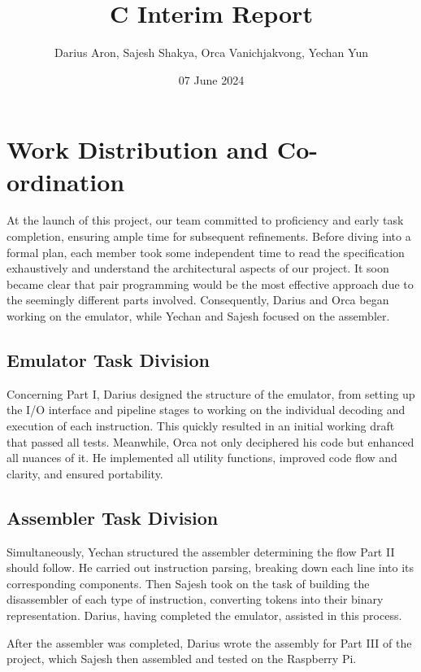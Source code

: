 \documentclass{article}
\title{C Interim Report}
\author{Darius Aron, Sajesh Shakya, Orca Vanichjakvong, Yechan Yun}
\date{07 June 2024}
\begin{document}
\maketitle

\section{Work Distribution and Co-ordination}

At the launch of this project, our team committed to proficiency and early task completion, ensuring ample time for subsequent refinements. Before diving into a formal plan, each member took some independent time to read the specification exhaustively and understand the architectural aspects of our project. It soon became clear that pair programming would be the most effective approach due to the seemingly different parts involved. Consequently, Darius and Orca began working on the emulator, while Yechan and Sajesh focused on the assembler.

\subsection{Emulator Task Division}

Concerning Part I, Darius designed the structure of the emulator, from setting up the I/O interface and pipeline stages to working on the individual decoding and execution of each instruction. This quickly resulted in an initial working draft that passed all tests. Meanwhile, Orca not only deciphered his code but enhanced all nuances of it. He implemented all utility functions, improved code flow and clarity, and ensured portability.

\subsection{Assembler Task Division}

Simultaneously, Yechan structured the assembler determining the flow Part II should follow. He carried out instruction parsing, breaking down each line into its corresponding components. Then Sajesh took on the task of building the disassembler of each type of instruction, converting tokens into their binary representation. Darius, having completed the emulator, assisted in this process.

After the assembler was completed, Darius wrote the assembly for Part III of the project, which Sajesh then assembled and tested on the Raspberry Pi.
\end{document}
